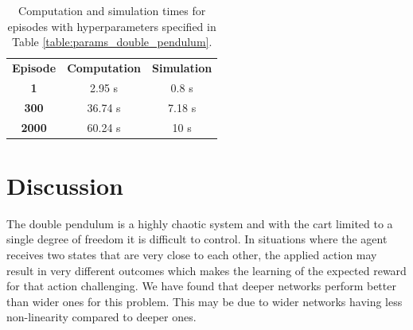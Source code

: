 \documentclass[final]{LTHtwocol} %
\begin{document}
\begin{table}[htp]
	\centering
	\begin{tabular}{|c|c|c|}
	\hline
	\rowcolor[HTML]{CBCEFB} 
	\multicolumn{3}{|c|}{\cellcolor[HTML]{CBCEFB}\textbf{Double Pendulum}} \\ \hline
	\rowcolor[HTML]{FFCCC9} 
	\textbf{Episode} & \textbf{Computation} & \textbf{Simulation} \\ \hline
	\rowcolor[HTML]{FFFFC7} 
	\textbf{1} & 2.95 s & 0.8 s\\ \hline
	\rowcolor[HTML]{FFFFC7} 
	\rowcolor[HTML]{FFFFC7} 
	\textbf{300} & 36.74 s & 7.18 s \\ \hline
	\rowcolor[HTML]{FFFFC7} 
	\rowcolor[HTML]{FFFFC7} 
	\textbf{2000} & 60.24 s & 10 s\\ \hline
	\end{tabular}
	\caption{Computation and simulation times for episodes with hyperparameters specified in Table \ref{table:params_double_pendulum}.}
	\label{table:def_params_time_double}
\end{table}

\section{Discussion}
The double pendulum is a highly chaotic system and with the cart limited to a single degree of freedom it is difficult to control.
In situations where the agent receives two states that are very close to each other, the applied action may result in very different outcomes which makes the learning of the expected reward for that action challenging.
We have found that deeper networks perform better than wider ones for this problem.
This may be due to wider networks having less non-linearity compared to deeper ones.
\end{document}
